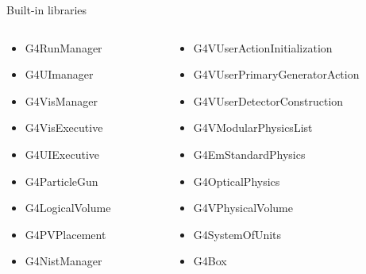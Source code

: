\documentclass[11pt]{beamer}
\begin{document}
\begin{frame}{Built-in libraries}
\begin{columns}
\begin{column}{0.4\textwidth}
    \begin{itemize}
        \item G4RunManager
        \item G4UImanager
        \item G4VisManager
        \item G4VisExecutive
        \item G4UIExecutive
        \item G4ParticleGun
        \item G4LogicalVolume
        \item G4PVPlacement
        \item G4NistManager
    \end{itemize}
\end{column}

\begin{column}{0.6\textwidth}
    \begin{itemize}
        \item G4VUserActionInitialization
        \item G4VUserPrimaryGeneratorAction
        \item G4VUserDetectorConstruction
        \item G4VModularPhysicsList
        \item G4EmStandardPhysics
        \item G4OpticalPhysics
        \item G4VPhysicalVolume
        \item G4SystemOfUnits
        \item G4Box
    \end{itemize}
\end{column}
\end{columns}
\end{frame}
\end{document}
